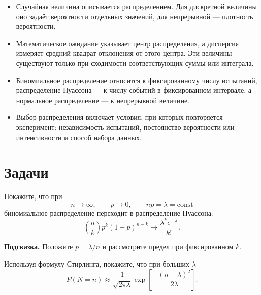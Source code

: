 \documentclass[
  russian,
  11pt,
  a4paper,
  open=any]{scrbook}
\providecommand{\tightlist}{%
  \setlength{\itemsep}{0pt}\setlength{\parskip}{0pt}}
\begin{document}
\begin{bookchaptersummary}

\begin{itemize}
\tightlist
\item
  Случайная величина описывается распределением. Для дискретной величины
  оно задаёт вероятности отдельных значений, для непрерывной ---
  плотность вероятности.
\item
  Математическое ожидание указывает центр распределения, а дисперсия
  измеряет средний квадрат отклонения от этого центра. Эти величины
  существуют только при сходимости соответствующих суммы или интеграла.
\item
  Биномиальное распределение относится к фиксированному числу испытаний,
  распределение Пуассона --- к числу событий в фиксированном интервале,
  а нормальное распределение --- к непрерывной величине.
\item
  Выбор распределения включает условия, при которых повторяется
  эксперимент: независимость испытаний, постоянство вероятности или
  интенсивности и способ набора данных.
\end{itemize}

\end{bookchaptersummary}

\section{Задачи}\label{ux437ux430ux434ux430ux447ux438-1}

\begin{semanticpdfbox}[colback=BookCoralSoft,borderline west={1.2mm}{0pt}{BookCoral}]

\par\nopagebreak[4]\vspace{1.2mm}

Покажите, что при \[
n\to\infty,\qquad p\to 0,\qquad np=\lambda=\text{const}
\] биномиальное распределение переходит в распределение Пуассона: \[
\binom{n}{k}p^k(1-p)^{n-k}
\longrightarrow
\frac{\lambda^k e^{-\lambda}}{k!}.
\]

\textbf{Подсказка.} Положите \(p=\lambda/n\) и рассмотрите предел при
фиксированном \(k\).

\end{semanticpdfbox}

\begin{semanticpdfbox}[colback=BookCoralSoft,borderline west={1.2mm}{0pt}{BookCoral}]

\par\nopagebreak[4]\vspace{1.2mm}

Используя формулу Стирлинга, покажите, что при больших \(\lambda\) \[
P(N=n)\approx
\frac{1}{\sqrt{2\pi\lambda}}
\exp\!\left[-\frac{(n-\lambda)^2}{2\lambda}\right].
\]

\end{semanticpdfbox}
\end{document}
